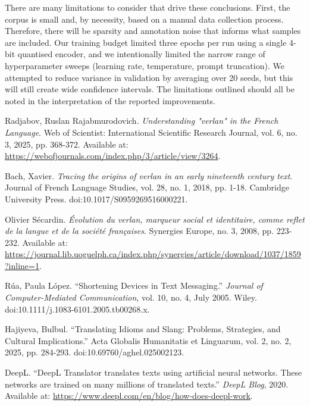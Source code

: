 \documentclass[12pt]{article}
\begin{document}
There are many limitations to consider that drive these conclusions. First, the corpus is small and, by necessity, based on a manual data collection process. Therefore, there will be sparsity and annotation noise that informs what samples are included. Our training budget limited three epochs per run using a single 4-bit quantised encoder, and we intentionally limited the narrow range of hyperparameter sweeps (learning rate, temperature, prompt truncation). We attempted to reduce variance in validation by averaging over 20 seeds, but this will still create wide confidence intervals. The limitations outlined should all be noted in the interpretation of the reported improvements.

\cleardoublepage
{}
\begin{thebibliography}{9}

Radjabov, Ruslan Rajabmurodovich. \textit{Understanding "verlan" in the French Language}. 
Web of Scientist: International Scientific Research Journal, vol. 6, no. 3, 2025, pp. 368-372. 
Available at: \url{https://webofjournals.com/index.php/3/article/view/3264}.

Bach, Xavier. \textit{Tracing the origins of verlan in an early nineteenth century text}. 
Journal of French Language Studies, vol. 28, no. 1, 2018, pp. 1-18. 
Cambridge University Press. doi:10.1017/S0959269516000221.

Olivier Sécardin. \textit{Évolution du verlan, marqueur social et identitaire, comme reflet de la langue et de la société françaises}. 
Synergies Europe, no. 3, 2008, pp. 223-232. 
Available at: \url{https://journal.lib.uoguelph.ca/index.php/synergies/article/download/1037/1859?inline=1}.

Rúa, Paula López. “Shortening Devices in Text Messaging.” 
\textit{Journal of Computer-Mediated Communication}, vol. 10, no. 4, July 2005. 
Wiley. doi:10.1111/j.1083-6101.2005.tb00268.x.

Hajiyeva, Bulbul. “Translating Idioms and Slang: Problems, Strategies, and Cultural Implications.”  
Acta Globalis Humanitatis et Linguarum, vol. 2, no. 2, 2025, pp. 284-293. doi:10.69760/aghel.025002123.  

DeepL. “DeepL Translator translates texts using artificial neural networks. These networks are trained on many millions of translated texts.” 
\textit{DeepL Blog}, 2020. Available at: \url{https://www.deepl.com/en/blog/how-does-deepl-work}.


\end{thebibliography}
\end{document}
